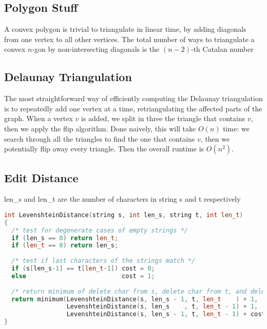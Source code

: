 \documentclass[10pt,a4paper]{article}
\begin{document}
\subsection*{Polygon Stuff}
A convex polygon is trivial to triangulate in linear time, by adding diagonals from one vertex to all other vertices.
The total number of ways to triangulate a convex $n$-gon by non-intersecting diagonals is the $(n - 2)$-th Catalan number

\subsection*{Delaunay Triangulation}
The most straightforward way of efficiently computing the Delaunay triangulation is to repeatedly add one vertex at a time, retriangulating the affected parts of the graph. When a vertex $v$ is added, we split in three the triangle that contains $v$, then we apply the flip algorithm. Done naively, this will take $O(n)$ time: we search through all the triangles to find the one that contains $v$, then we potentially flip away every triangle. Then the overall runtime is $O(n^2)$.

\subsection*{Edit Distance}
len\_s and len\_t are the number of characters in string s and t respectively

\begin{lstlisting}[language=C++]
int LevenshteinDistance(string s, int len_s, string t, int len_t)
{
  /* test for degenerate cases of empty strings */
  if (len_s == 0) return len_t;
  if (len_t == 0) return len_s;
 
  /* test if last characters of the strings match */
  if (s[len_s-1] == t[len_t-1]) cost = 0;
  else                          cost = 1;
 
  /* return minimum of delete char from s, delete char from t, and delete char from both */
  return minimum(LevenshteinDistance(s, len_s - 1, t, len_t    ) + 1,
                 LevenshteinDistance(s, len_s    , t, len_t - 1) + 1,
                 LevenshteinDistance(s, len_s - 1, t, len_t - 1) + cost);
}
\end{lstlisting}
\end{document}
